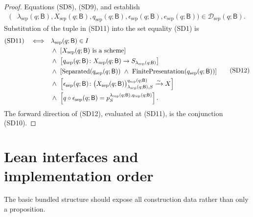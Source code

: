 \begin{proof}
  Equations (SD8), (SD9), and
   establish
  \[
  \begin{split}
    \bigl(&
      \lambda_{\mathrm{sep}}(q;\mathsf B),
      X_{\mathrm{sep}}(q;\mathsf B),
      q_{\mathrm{sep}}(q;\mathsf B),
      \epsilon_{\mathrm{sep}}(q;\mathsf B),
      e_{\mathrm{sep}}(q;\mathsf B)
    \bigr)
    \in\mathscr D_{\mathrm{sep}}(q;\mathsf B).
  \end{split}                                                       \tag{SD11}
  \]
  Substitution of the tuple in (SD11) into the set equality (SD1) is
  \[
  \begin{split}
    \text{\rm(SD11)}
    \quad\Longleftrightarrow\quad&
    \lambda_{\mathrm{sep}}(q;\mathsf B)\in I\\
    &{}\wedge\
    \left[
      X_{\mathrm{sep}}(q;\mathsf B)\text{ is a scheme}
    \right]\\
    &{}\wedge\
    \left[
      q_{\mathrm{sep}}(q;\mathsf B)\colon
      X_{\mathrm{sep}}(q;\mathsf B)
        \to S_{\lambda_{\mathrm{sep}}(q;\mathsf B)}
    \right]\\
    &{}\wedge\
    \left[
      \operatorname{Separated}(q_{\mathrm{sep}}(q;\mathsf B))
      \ \wedge\
      \operatorname{FinitePresentation}(q_{\mathrm{sep}}(q;\mathsf B))
    \right]\\
    &{}\wedge\
    \left[
      \epsilon_{\mathrm{sep}}(q;\mathsf B)\colon
      \bigl(X_{\mathrm{sep}}(q;\mathsf B)\bigr)_{
        \lambda_{\mathrm{sep}}(q;\mathsf B),S}^{
          q_{\mathrm{sep}}(q;\mathsf B)}
        \xrightarrow{\sim}X
    \right]\\
    &{}\wedge\
    \left[
      q\circ\epsilon_{\mathrm{sep}}(q;\mathsf B)
        =p_S^{
          \lambda_{\mathrm{sep}}(q;\mathsf B),
          q_{\mathrm{sep}}(q;\mathsf B)}
    \right].
  \end{split}                                                       \tag{SD12}
  \]
  The forward direction of (SD12), evaluated at (SD11), is the
  conjunction (SD10).
\end{proof}


\section{Lean interfaces and implementation order}

The basic bundled structure should expose all construction data rather than
only a proposition.

